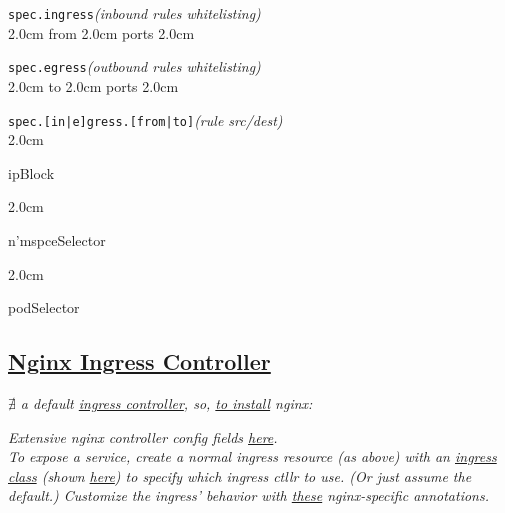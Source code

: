 \texttt{spec.ingress}\quad\textit{(inbound rules whitelisting)}\\[-2mm]
\api
{2.0cm}{
from
}
{2.0cm}{
ports
}
{2.0cm}{

}
\stopapi


\texttt{spec.egress}\quad\textit{(outbound rules whitelisting)}\\[-2mm]
\api
{2.0cm}{
to
}
{2.0cm}{
ports
}
{2.0cm}{

}
\stopapi

\texttt{spec.[in|e]gress.[from|to]}\quad\textit{(rule src/dest)}\\[-2mm]
\api
{2.0cm}{
ipBlock

}
{2.0cm}{
n'mspceSelector      

}
{2.0cm}{
podSelector

}
\stopapi


\subsection*{\href{https://kubernetes.github.io/ingress-nginx/}{Nginx Ingress Controller}}
{\footnotesize \textit{$\nexists$ a default \href{https://kubernetes.io/docs/concepts/services-networking/ingress-controllers/}{ingress controller}, so, \href{https://kubernetes.github.io/ingress-nginx/deploy/}{to install} nginx:}}\\

\begin{comment}
\textit{Confirm proper installation:}\\
\code{POD\_NAME=\$(kubectl get pods /}\\
\code{\phantom{xxxx}-l app.kubernetes.io/name=ingress-nginx }\\
\code{\phantom{xxxx}-o jsonpath='\{.items[0].metadata.name\}')} \\
\code{kubectl exec -it \$POD\_NAME -{}- /} \\
\code{\phantom{xxxx}/nginx-ingress-controller --version} \\
\end{comment}

{\footnotesize \textit{Extensive nginx controller config fields \href{https://kubernetes.github.io/ingress-nginx/user-guide/nginx-configuration/configmap/}{here}.}\\[1mm]
\textit{To expose a service, create a normal ingress resource (as above) with an \href{https://github.com/kubernetes/ingress-gce/blob/master/docs/faq/README.md\#how-do-i-run-multiple-ingress-controllers-in-the-same-cluster}{ingress class} (shown \href{https://kubernetes.github.io/ingress-nginx/user-guide/basic-usage/}{here}) to specify which ingress ctllr to use. (Or just assume the default.) Customize the ingress' behavior with \href{https://kubernetes.github.io/ingress-nginx/user-guide/nginx-configuration/annotations/}{these} nginx-specific annotations.}}

